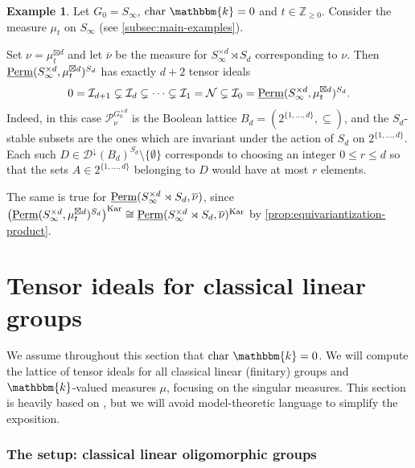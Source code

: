 \documentclass[11pt,a4paper]{amsart}
\theoremstyle{plain}%
\theoremstyle{definition}
\newtheorem{example}[lemma]{Example}
\theoremstyle{remark}
\newcommand{\Perm}{\underline{{\rm Perm}}}
\newcommand{\kk}{\mathbbm{k}}
\newcommand{\Kar}{\mathrm{Kar}}
\newcommand{\Down}{\mathcal{D}^{\downarrow}}
\begin{document}
\begin{example}

Let $G_0=S_\infty$, $\mathrm{char} ~\kk=0$ and $t\in\mathbb Z_{\geq0}$. Consider the measure $\mu_t$ on $S_{\infty}$ (see \cref{subsec:main-examples}). 

Set $\nu=\mu_t^{\boxtimes d}$ and let $\overline{\nu}$ be the measure for $S_\infty^{\times d}\rtimes S_d$ corresponding to $\nu$. Then $\Perm(S_\infty^{\times d}, \mu_t^{\boxtimes d})^{S_d} $ has exactly $d+2$ tensor ideals
\[
 0=\mathcal I_{d+1}\subsetneq\mathcal I_d\subsetneq\cdots
 \subsetneq\mathcal I_1=\mathcal N\subsetneq\mathcal I_0=\Perm(S_\infty^{\times d}, \mu_t^{\boxtimes d})^{S_d}.
\]
Indeed, in this case $\mathcal{P}^{G_0^{\times d}}_\nu$ is the Boolean lattice $B_d=(2^{\{1,\ldots, d\}}, \subseteq)$, and the $S_d$-stable subsets are the ones which are invariant under the action of $S_d$ on $2^{\{1,\ldots, d\}}$. Each such $D\in \Down(B_d)^{S_d}\setminus\{\emptyset\}$ corresponds to choosing an integer $0\leq r\leq d$ so that the sets $A\in 2^{\{1,\ldots, d\}}$ belonging to $D$ would have at most $r$ elements.

The same is true for $\Perm(S_\infty^{\times d}\rtimes S_d, \overline{\nu})$, since $\left(\Perm(S_\infty^{\times d}, \mu_t^{\boxtimes d})^{S_d} \right)^{\Kar}\cong \Perm(S_\infty^{\times d}\rtimes S_d, \overline{\nu})^{\Kar}$ by \cref{prop:equivariantization-product}.
\end{example}






\part{Tensor ideals for classical linear groups}\label{sec:classical}


We assume throughout this section that $\mathrm{char}~\kk=0$. We will compute the lattice of tensor ideals for all classical linear (finitary) groups and $\kk$-valued measures $\mu$, focusing on the singular measures. This section is heavily based on \cite{HS-classical}, but we will avoid model-theoretic language to simplify the exposition.

\section{The setup: classical linear oligomorphic groups}\label{ssec:setup_classcial_grps}
\end{document}
